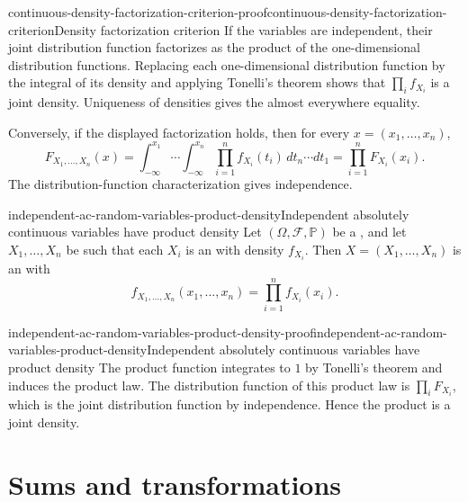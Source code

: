\documentclass[preview]{standalone}
\begin{document}
\begin{snippetproof}{continuous-density-factorization-criterion-proof}{continuous-density-factorization-criterion}{Density factorization criterion}
    If the variables are independent, their joint distribution function
    factorizes as the product of the one-dimensional distribution functions.
    Replacing each one-dimensional distribution function by the integral of
    its density and applying Tonelli's theorem shows that
    \(\prod_i f_{X_i}\) is a joint density. Uniqueness of densities gives the
    almost everywhere equality.

    Conversely, if the displayed factorization holds, then for every
    \(x=(x_1,\ldots,x_n)\),
    \[
        F_{X_1,\ldots,X_n}(x)
        =
        \int_{-\infty}^{x_1}\cdots\int_{-\infty}^{x_n}
        \prod_{i=1}^n f_{X_i}(t_i)\,dt_n\cdots dt_1
        =
        \prod_{i=1}^n F_{X_i}(x_i).
    \]
    The distribution-function characterization gives independence.
\end{snippetproof}

\begin{snippetcorollary}{independent-ac-random-variables-product-density}{Independent absolutely continuous variables have product density}
    Let \((\Omega,\mathcal F,\mathbb P)\) be a \probabilityspace, and let
    \(X_1,\ldots,X_n\) be \independentrandomvariables such that each \(X_i\)
    is an \absolutelycontinuousrandomvariable with density \(f_{X_i}\). Then
    \(X=(X_1,\ldots,X_n)\) is an \absolutelycontinuousrandomvector with
    \continuousjointdensity
    \[
        f_{X_1,\ldots,X_n}(x_1,\ldots,x_n)
        =
        \prod_{i=1}^n f_{X_i}(x_i).
    \]
\end{snippetcorollary}

\begin{snippetproof}{independent-ac-random-variables-product-density-proof}{independent-ac-random-variables-product-density}{Independent absolutely continuous variables have product density}
    The product function integrates to \(1\) by Tonelli's theorem and induces
    the product law. The distribution function of this product law is
    \(\prod_i F_{X_i}\), which is the joint distribution function by
    independence. Hence the product is a joint density.
\end{snippetproof}

\section{Sums and transformations}
\end{document}
